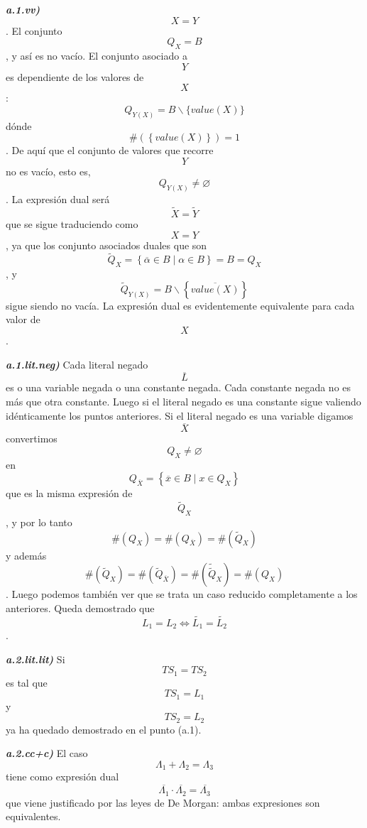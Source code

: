 \begin{enumerate}
\begin{enumerate}
\begin{enumerate}
\begin{enumerate}
\begin{enumerate}
          \emph{\textbf{a.1.vv)}} \[X = Y\]. El conjunto \[Q_{X} = B\] ,
          y así es no vacío. El conjunto asociado a \[Y\] es dependiente
          de los valores de \[X\]:
          \[Q_{Y{(X)}} = {B \smallsetminus {\{{\mathit{value}{(X)}}\}}}\]dónde
          \[\#{\left( \left\{ {\mathit{value}{(X)}} \right\} \right) = 1}\].
          De aquí que el con\-junto de valores que recorre \[Y\]no es
          vacío, esto es, \[Q_{Y{(X)}} \neq \varnothing\]. La
          ex\-presión dual será \[\widetilde{X} = \widetilde{Y}\] que se
          sigue traduciendo como \[X = Y\], ya que los conjunto
          asociados duales que son
          \[{{{\widetilde{Q}}_{X} = \left\{ {{\overline{\alpha} \in B} \mid {\alpha \in B}} \right\}} = B} = Q_{X}\],
          y
          \[{\widetilde{Q}}_{Y{(X)}} = {B \smallsetminus \left\{ \overline{\mathit{value}{(X)}} \right\}}\]sigue
          siendo no vacía. La expresión dual es evi\-dentemente
          equivalente para cada valor de \[X\].

          \emph{\textbf{a.1.lit.neg)}} Cada literal negado
          \[\overline{L}\] es o una variable negada o una cons\-tante
          negada. Cada constante negada no es más que otra constante.
          Luego si el literal negado es una constante sigue valiendo
          idénticamente los puntos anteriores. Si el literal negado es
          una variable digamos \[\overline{X}\] convertimos
          \[Q_{X} \neq \varnothing\] en
          \[Q_{\overline{X}} = \left\{ {{\overline{x} \in B} \mid {x \in Q_{X}}} \right\}\]
          que es la misma expresión de \[{\widetilde{Q}}_{X}\], y por lo
          tanto
          \[\#{{(Q_{X})} = \#}{{(Q_{\overline{X}})} = \#}{({\widetilde{Q}}_{X})}\]y
          además
          \[\#{{({\widetilde{Q}}_{X})} = \#}{{({\widetilde{Q}}_{\overline{X}})} = \#}{{({\widetilde{\widetilde{Q}}}_{X})} = \#}{(Q_{X})}\].
          Luego podemos también ver que se trata un caso reducido
          completamente a los anteriores. Queda demostrado que
          \[{L_{1} = L_{2}}\Leftrightarrow{\widetilde{L_{1}} = \widetilde{L_{2}}}\]
          .

          \emph{\textbf{a.2.lit.lit)}} Si
          \[\mathit{TS}_{1} = \mathit{TS}_{2}\] es tal que
          \[\mathit{TS}_{1} = L_{1}\] y \[\mathit{TS}_{2} = L_{2}\] ya
          ha queda\-do demostrado en el punto (a.1).

          \emph{\textbf{a.2.cc+c)}} El caso
          \[{\Lambda_{1} + \Lambda_{2}} = \Lambda_{3}\] tiene como
          expresión dual
          \[{\overline{\Lambda_{1}} \cdot \overline{\Lambda_{2}}} = \overline{\Lambda_{3}}\]que
          viene justificado por las leyes de De Morgan: ambas
          expresiones son equivalentes.


\end{enumerate}
\end{enumerate}
\end{enumerate}
\end{enumerate}
\end{enumerate}
